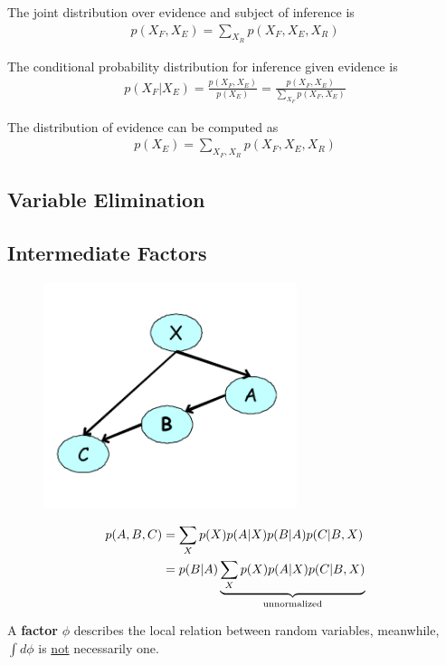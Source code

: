 \documentclass{article}
\begin{document}
	\begin{definition}
		The joint distribution over evidence and subject of inference is
		\begin{align}
			p\left(X_{F}, X_{E}\right)=\sum_{X_{R}} p\left(X_{F}, X_{E}, X_{R}\right)
		\end{align}
	\end{definition}
	
	\begin{definition}
		The conditional probability distribution for inference given evidence is
		\begin{align}
			p\left(X_{F} | X_{E}\right)=\frac{p\left(X_{F}, X_{E}\right)}{p\left(X_{E}\right)}=\frac{p\left(X_{F}, X_{E}\right)}{\sum_{X_{F}} p\left(X_{F}, X_{E}\right)}
		\end{align}
	\end{definition}
	
	\begin{definition}
		The distribution of evidence can be computed as
		\begin{align}
			p\left(X_{E}\right)=\sum_{X_{F}, X_{R}} p\left(X_{F}, X_{E}, X_{R}\right)
		\end{align}
	\end{definition}
	
	\subsection{Variable Elimination}
	
	\subsection{Intermediate Factors}
	\begin{figure}[H]
		\centering
		\includegraphics[width=0.3\linewidth]{figures/week_4_2.png}
	\end{figure}
	\begin{align}
		p(A, B, C) &=\sum_{X} p(X) p(A | X) p(B | A) p(C | B, X) \\
		&=p(B | A) \underbrace{\sum_{X} p(X) p(A | X) p(C | B, X)}_{\text{{unnormalized}}}
	\end{align}
	\begin{definition}
		A \textbf{factor} $\phi$ describes the local relation between random variables, meanwhile, $\int d\phi$ is \ul{not} necessarily one.
	\end{definition}
\end{document}
